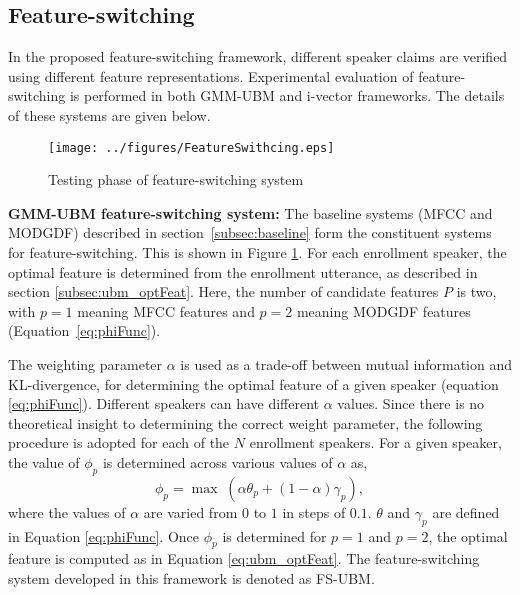 \documentclass[preprint,12pt,5p]{elsarticle}
\begin{document}
\subsection{Feature-switching}
\label{subsec:featSwitch}
In the proposed feature-switching framework, different speaker
claims are verified using different feature representations. 
Experimental evaluation of feature-switching is performed in both
GMM-UBM and i-vector frameworks. The details of these systems
are given below.
\begin{figure}[h]
\centering
\texttt{[image: ../figures/FeatureSwithcing.eps]}
\caption{Testing phase of feature-switching system}
\vspace{3mm}
\label{fig:systemArch2}
\end{figure}

\textbf{GMM-UBM feature-switching system:} 
\hspace{-6	mm}The baseline systems (MFCC and MODGDF) 
described in section~\ref{subsec:baseline} form the constituent systems for 
feature-switching. This is shown in Figure \ref{fig:systemArch2}. For each enrollment 
speaker, the optimal feature is determined from the enrollment utterance, as described in
section \ref{subsec:ubm_optFeat}. Here, the number of candidate features $P$
is two, with $p=1$ meaning MFCC features and $p=2$ meaning MODGDF features
(Equation~\ref{eq:phiFunc}).

The weighting parameter $\alpha$ is used as a trade-off between mutual information and
KL-divergence, for determining the optimal feature of a given speaker (equation
\ref{eq:phiFunc}). Different speakers can have different $\alpha$ values. Since
there is no theoretical insight to determining the correct weight parameter,
the following procedure is adopted for each of the $N$ enrollment speakers.
For a given speaker, the value of $\phi_p$ is determined across various values
of $\alpha$ as, 
\begin{equation}
\phi_p = \max \; (\alpha \theta_p + (1-\alpha) \gamma_p),
\end{equation}
where the values of $\alpha$ are varied from $0$ to $1$ in steps of $0.1$. $\theta$ and 
$\gamma_p$ are defined in Equation \ref{eq:phiFunc}. Once
$\phi_p$ is determined for $p=1$ and $p=2$, the optimal feature is computed as in Equation
\ref{eq:ubm_optFeat}.
The feature-switching system developed in this framework is denoted as
FS-UBM. 
\end{document}
